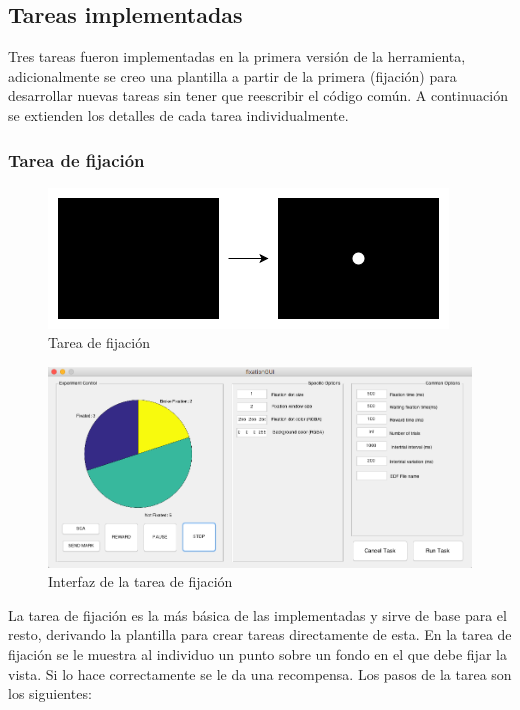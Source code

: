 \documentclass[conference]{IEEEtran}
\begin{document}
\subsection{Tareas implementadas}

Tres tareas fueron implementadas en la primera versión de la herramienta, adicionalmente se creo una plantilla a partir de la primera (fijación) para desarrollar nuevas tareas sin tener que reescribir el código común. 
A continuación se extienden los detalles de cada tarea individualmente.

\subsubsection*{Tarea de fijación}

\begin{figure}[htbp]
\centerline{\includegraphics[width=\linewidth]{figures/fixation}}
\caption{Tarea de fijación}
\label{figfixTask}
\end{figure}

\begin{figure}[htbp]
\centerline{\includegraphics[width=\linewidth]{figures/fixation_gui}}
\caption{Interfaz de la tarea de fijación}
\label{figfixGUI}
\end{figure}

La tarea de fijación es la más básica de las implementadas y sirve de base para el resto, derivando la plantilla para crear tareas directamente de esta. 
En la tarea de fijación se le muestra al individuo un punto sobre un fondo en el que debe fijar la vista. Si lo hace correctamente se le da una recompensa.
Los pasos de la tarea son los siguientes:
\end{document}

